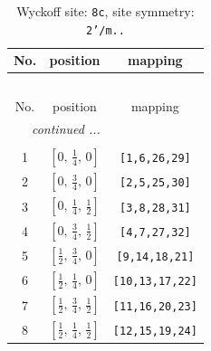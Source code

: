 \documentclass[fleqn,8pt]{jsarticle}
\begin{document}
\begin{longtable}{ccc}
\caption{Wyckoff site: {\tt 8c}, site symmetry: {\tt 2'/m..}}
 \\
 \hline \hline
No. & position & mapping \\ \hline \endfirsthead

\multicolumn{2}{l}{\tablename\ \thetable{}} \\
 \hline \hline
No. & position & mapping \\ \hline \endhead

 \hline \hline
\multicolumn{2}{r}{\footnotesize\it continued ...} \\ \endfoot

 \hline \hline
\multicolumn{2}{r}{} \\ \endlastfoot

1 & $\left[ 0,\, \frac{1}{4},\, 0 \right]$ & {\tt [1,6,26,29]} \\ \hline
2 & $\left[ 0,\, \frac{3}{4},\, 0 \right]$ & {\tt [2,5,25,30]} \\ \hline
3 & $\left[ 0,\, \frac{1}{4},\, \frac{1}{2} \right]$ & {\tt [3,8,28,31]} \\ \hline
4 & $\left[ 0,\, \frac{3}{4},\, \frac{1}{2} \right]$ & {\tt [4,7,27,32]} \\ \hline
5 & $\left[ \frac{1}{2},\, \frac{3}{4},\, 0 \right]$ & {\tt [9,14,18,21]} \\ \hline
6 & $\left[ \frac{1}{2},\, \frac{1}{4},\, 0 \right]$ & {\tt [10,13,17,22]} \\ \hline
7 & $\left[ \frac{1}{2},\, \frac{3}{4},\, \frac{1}{2} \right]$ & {\tt [11,16,20,23]} \\ \hline
8 & $\left[ \frac{1}{2},\, \frac{1}{4},\, \frac{1}{2} \right]$ & {\tt [12,15,19,24]} \\
\end{longtable}
\renewcommand{\arraystretch}{1.2}
\end{document}
